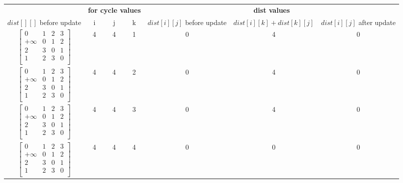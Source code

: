 \documentclass{report}
\begin{document}
\begin{table}[h]
\centering
\begin{tabular}{ccccccc}
\toprule
\multicolumn{1}{c}{} & \multicolumn{3}{c}{\textbf{for cycle values}} & \multicolumn{3}{c}{\textbf{dist values}} \\
\cmidrule(rl){2-4} \cmidrule(rl){5-7}
{$dist[][]$ before update} & {i} & {j} & {k} & {$dist[i][j]$ before update} & {$dist[i][k] + dist[k][j]$} & {$dist[i][j]$ after update} \\
\midrule
$\begin{bmatrix}
    0 & 1 & 2 & 3 \\
    +\infty & 0 & 1 & 2 \\
    2 & 3 & 0 & 1 \\
    1 & 2 & 3 & 0 \\
\end{bmatrix}$ & 4 & 4 & 1 & 0 & 4 & 0 \\
\bottomrule
$\begin{bmatrix}
    0 & 1 & 2 & 3 \\
    +\infty & 0 & 1 & 2 \\
    2 & 3 & 0 & 1 \\
    1 & 2 & 3 & 0 \\
\end{bmatrix}$ & 4 & 4 & 2 & 0 & 4 & 0 \\
\bottomrule
$\begin{bmatrix}
    0 & 1 & 2 & 3 \\
    +\infty & 0 & 1 & 2 \\
    2 & 3 & 0 & 1 \\
    1 & 2 & 3 & 0 \\
\end{bmatrix}$ & 4 & 4 & 3 & 0 & 4 & 0 \\
\bottomrule
$\begin{bmatrix}
    0 & 1 & 2 & 3 \\
    +\infty & 0 & 1 & 2 \\
    2 & 3 & 0 & 1 \\
    1 & 2 & 3 & 0 \\
\end{bmatrix}$ & 4 & 4 & 4 & 0 & 0 & 0 \\
\bottomrule
\end{tabular}
\end{table}
\end{document}
